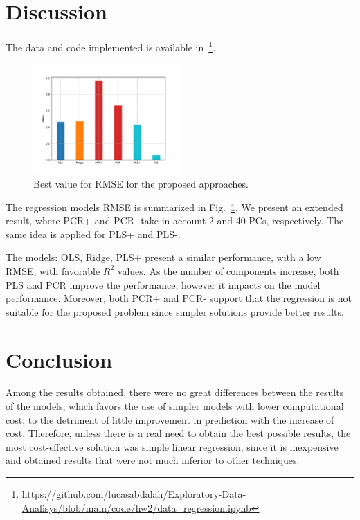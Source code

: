 \section{Discussion}

The data and code implemented is available in~\footnote{\url{https://github.com/lucasabdalah/Exploratory-Data-Analisys/blob/main/code/hw2/data_regression.ipynb}}.

\begin{figure}[htbp!]
  \centerline{\includegraphics[width=0.5\textwidth]{../../code/hw2/figures/5-summary.pdf}}
  \caption{Best value for RMSE for the proposed approaches.}
  \label{fig:5-summary}
\end{figure}

The regression models RMSE is summarized in Fig.~\ref{fig:5-summary}. We present an extended result, where PCR+ and PCR- take in account 2 and 40 PCs, respectively. The same idea is applied for PLS+ and PLS-. 

The models: OLS, Ridge, PLS+ present a similar performance, with a low RMSE, with favorable $R^2$ values. As the number of components increase, both PLS and PCR improve the performance, however it impacts on the model performance. Moreover, both PCR+ and PCR- support that the regression is not suitable for the proposed problem since simpler solutions provide better results. 

\section{Conclusion}
Among the results obtained, there were no great differences between the results of the models, which favors the use of simpler models with lower computational cost, to the detriment of little improvement in prediction with the increase of cost. Therefore, unless there is a real need to obtain the best possible results, the most cost-effective solution was simple linear regression, since it is inexpensive and obtained results that were not much inferior to other techniques. 

